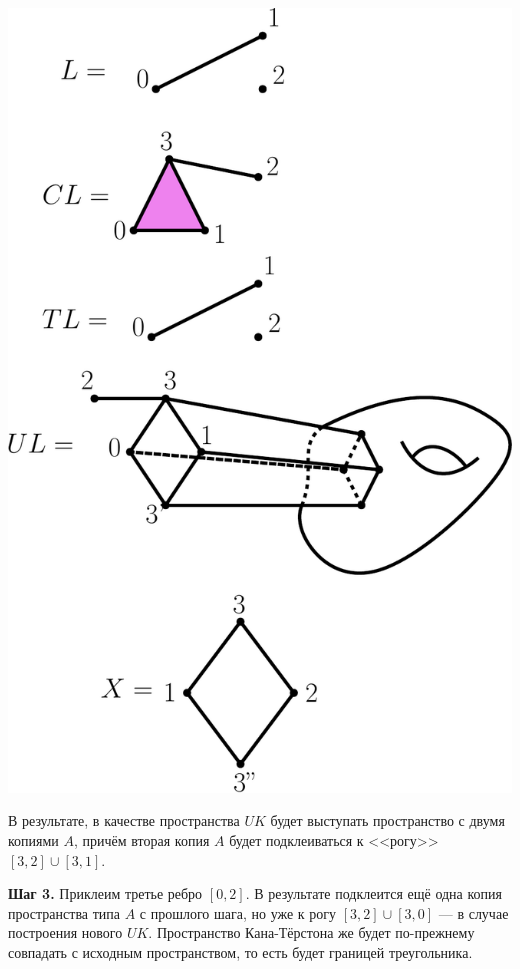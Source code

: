 \documentclass[14pt, dvipsnames]{extarticle}
\theoremstyle{definition}
\theoremstyle{remark}
\begin{document}
\begin{center}
\includegraphics[scale=0.4]{pict5}
\end{center}
 

В результате, в качестве пространства $UK$ будет выступать пространство с двумя копиями $A$, причём вторая копия $A$ будет подклеиваться к <<рогу>> $[3,2]\cup [3, 1]$.


{\bf Шаг 3.} Приклеим третье ребро $[0, 2]$. В результате подклеится ещё одна копия пространства типа $A$ с прошлого шага, но уже к рогу $[3, 2]\cup [3, 0]$ --- в случае построения нового $UK$. Пространство Кана-Тёрстона же будет по-прежнему совпадать с исходным пространством, то есть будет границей треугольника.
\end{document}
